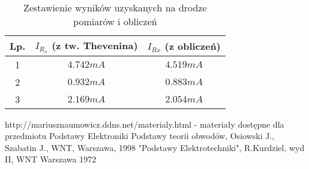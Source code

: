 \documentclass[polish,a4paper]{article}
\begin{document}
\begin{table}[H]
\centering
\begin{tabular}{|c|c|c|}
\hline
 Lp.& $I_{R_{x}}$ (z tw. Thevenina) & $I_{Rx}$ (z obliczeń) \\
\hline 
1 & $4.742mA$ & $4.519mA$\\
\hline
 2&$0.932mA$ & $0.883mA$\\
\hline
3 & $2.169mA$ & $2.054mA$\\
\hline
\end{tabular}

\caption{Zestawienie wyników uzyskanych na drodze pomiarów i obliczeń}
\end{table}
\newpage

\begin{thebibliography}{3}
 http://mariusznaumowicz.ddns.net/materialy.html - materiały dostępne dla przedmiotu Podstawy Elektroniki
Podstawy teorii obwodów, Osiowski J., Szabatin J., WNT, Warszawa, 1998
"Podstawy Elektrotechniki", R.Kurdziel, wyd II, WNT Warszawa 1972
\end{thebibliography}

\newpage
\tableofcontents{}
\end{document}

